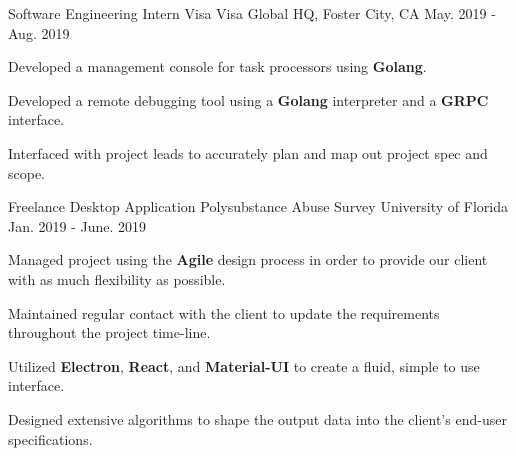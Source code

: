 \begin{cventries}
	
	\cventry
	{Software Engineering Intern} %
	{Visa} %
	{Visa Global HQ, Foster City, CA} %
	{May. 2019 - Aug. 2019} %
	{ %
		\begin{cvitems}
			\setlength{\itemindent}{.125in}
			\item {Developed a management console for task processors using \textbf{Golang}.}
			\item {Developed a remote debugging tool using a \textbf{Golang} interpreter and a \textbf{GRPC} interface.}
			\item {Interfaced with project leads to accurately plan and map out project spec and scope.}
		\end{cvitems}
	}
	
	
	\cventry
	{Freelance Desktop Application} %
	{Polysubstance Abuse Survey} %
	{University of Florida} %
	{Jan. 2019 - June. 2019} %
	{ %
		\begin{cvitems}
			\setlength{\itemindent}{.125in}
			\item {Managed project using the \textbf{Agile} design process in order to provide our client with as much flexibility as possible.}
			\item {Maintained regular contact with the client to update the requirements throughout the project time-line.}
			\item {Utilized \textbf{Electron}, \textbf{React}, and \textbf{Material-UI} to create a fluid, simple to use interface. }
			\item {Designed extensive algorithms to shape the output data into the client's end-user specifications.}
		\end{cvitems}
	}


	
\end{cventries}
